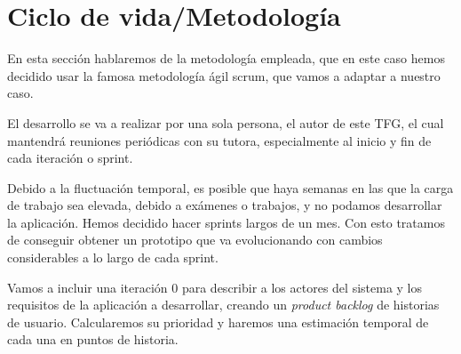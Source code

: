 \section{Ciclo de vida/Metodología}  \label{metod}
En esta sección hablaremos de la metodología empleada, que en este caso hemos decidido usar la famosa metodología ágil scrum, que vamos a adaptar a nuestro caso.

El desarrollo se va a realizar por una sola persona, el autor de este TFG, el cual mantendrá reuniones periódicas con su tutora, especialmente al inicio y fin de cada iteración o sprint.

Debido a la fluctuación temporal, es posible que haya semanas en las que la carga de trabajo sea elevada, debido a exámenes o trabajos, y no podamos desarrollar la aplicación. Hemos decidido hacer sprints largos de un mes. Con esto tratamos de conseguir obtener un prototipo que va evolucionando con cambios considerables a lo largo de cada sprint.

Vamos a incluir una iteración 0 para describir a los actores del sistema y los requisitos de la aplicación a desarrollar, creando un \textit{product backlog} de historias de usuario. Calcularemos  su prioridad y haremos una estimación temporal de cada una en puntos de historia.  


